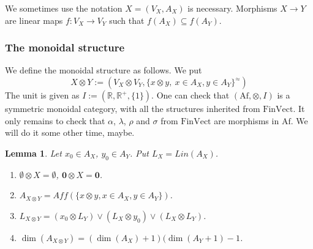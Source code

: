 \documentclass[12pt]{article}
\newtheorem{lemma}{Lemma}
\theoremstyle{definition}
\theoremstyle{remark}
\def \Af{\mathrm{Af}}
\def \FV{\mathrm{FinVect}}
\def\bI{I}
\def\bX{ X}
\def\bY{ Y}
\begin{document}
We sometimes use the notation $\bX=(V_\bX,A_\bX)$ is necessary.
Morphisms $\bX\to \bY$ are linear maps $f: V_\bX\to V_\bY$ such that $f(A_\bX)\subseteq
f(A_\bY)$.



\subsubsection{The monoidal structure}


We define the monoidal structure as follows. We put
\[
\bX\otimes \bY:=(V_\bX\otimes V_\bY, \{x\otimes y,\ x\in A_\bX, y\in
A_\bY\}^{\approx})
\]
The unit is given as $\bI:=(\mathbb R, \mathbb R^+, \{1\})$. One can check that $(\Af,
\otimes, \bI)$ is a symmetric monoidal category, with all the structures inherited from
$\FV$. It only remains to check that $\alpha$, $\lambda$, $\rho$ and $\sigma$ from $\FV$
are morphisms in $\Af$. We will do it some other time, maybe.


\begin{lemma}\label{lemma:tensor_aff} Let $x_0\in A_\bX$, $y_0\in A_\bY$. Put $L_\bX=Lin(A_\bX)$.

\begin{enumerate}
\item[(1)] $\bm{\emptyset}\otimes \bX=\bm{\emptyset}$, $\bm{0}\otimes \bX=\bm{0}$.
\item[(2)] $A_{\bX\otimes \bY}=Aff(\{x\otimes y, x\in A_\bX, y\in A_\bY\})$.
\item[(3)] $L_{\bX\otimes \bY}= (x_0\otimes L_\bY)\vee (L_\bX\otimes y_0)\vee (L_\bX\otimes
L_\bY)$.
\item[(4)] $\dim(A_{\bX\otimes \bY})=(\dim(A_\bX)+1)(\dim(A_{\bY}+1)-1$.


\end{enumerate}

\end{lemma}
\end{document}
